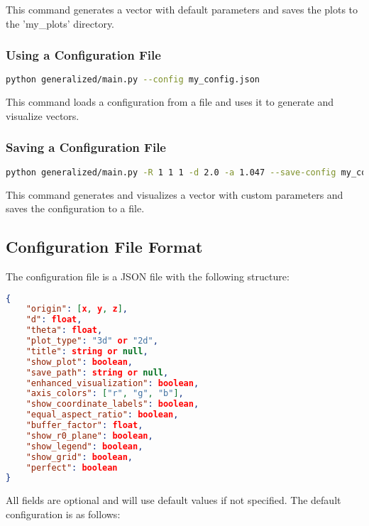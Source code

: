 This command generates a vector with default parameters and saves the plots to the 'my\_plots' directory.

\subsubsection{Using a Configuration File}

\begin{lstlisting}[language=bash]
python generalized/main.py --config my_config.json
\end{lstlisting}

This command loads a configuration from a file and uses it to generate and visualize vectors.

\subsubsection{Saving a Configuration File}

\begin{lstlisting}[language=bash]
python generalized/main.py -R 1 1 1 -d 2.0 -a 1.047 --save-config my_config.json
\end{lstlisting}

This command generates and visualizes a vector with custom parameters and saves the configuration to a file.

\subsection{Configuration File Format}

The configuration file is a JSON file with the following structure:

\begin{lstlisting}[language=json]
{
    "origin": [x, y, z],
    "d": float,
    "theta": float,
    "plot_type": "3d" or "2d",
    "title": string or null,
    "show_plot": boolean,
    "save_path": string or null,
    "enhanced_visualization": boolean,
    "axis_colors": ["r", "g", "b"],
    "show_coordinate_labels": boolean,
    "equal_aspect_ratio": boolean,
    "buffer_factor": float,
    "show_r0_plane": boolean,
    "show_legend": boolean,
    "show_grid": boolean,
    "perfect": boolean
}
\end{lstlisting}

All fields are optional and will use default values if not specified. The default configuration is as follows:

